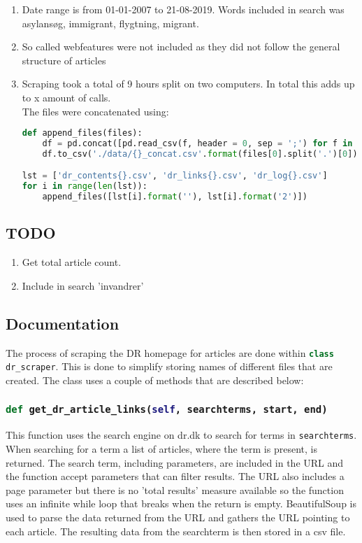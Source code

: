 \documentclass[10pt,a4paper]{article}
\author{Sebastian Baltser}
\newcommand{\python}{\lstinline[language=Python]}
\begin{document}
	\begin{enumerate}
		\item Date range is from 01-01-2007 to 21-08-2019. Words included in search was asylansøg, immigrant, flygtning, migrant.
		\item So called webfeatures were not included as they did not follow the general structure of articles
		\item Scraping took a total of 9 hours split on two computers. In total this adds up to x amount of calls.\\
		The files were concatenated using:
\begin{lstlisting}[language=Python]
def append_files(files):
	df = pd.concat([pd.read_csv(f, header = 0, sep = ';') for f in files], axis = 0)
	df.to_csv('./data/{}_concat.csv'.format(files[0].split('.')[0]), index = False) #Save to csv named as the first file with 'concat' appended

lst = ['dr_contents{}.csv', 'dr_links{}.csv', 'dr_log{}.csv']
for i in range(len(lst)):
	append_files([lst[i].format(''), lst[i].format('2')])
\end{lstlisting}
	\end{enumerate}
	\subsection{TODO}
	\begin{enumerate}
		\item Get total article count.
		\item Include in search 'invandrer'
	\end{enumerate}
	\subsection{Documentation}
		The process of scraping the DR homepage for articles are done within \lstinline[language=Python]|class dr_scraper|. This is done to simplify storing names of different files that are created. The class uses a couple of methods that are described below:
		\subsubsection{\python|def get_dr_article_links(self, searchterms, start, end)|}
			This function uses the search engine on dr.dk to search for terms in \python{searchterms}. When searching for a term a list of articles, where the term is present, is returned. The search term, including parameters, are included in the URL and the function accept parameters that can filter results. The URL also includes a page parameter but there is no 'total results' measure available so the function uses an infinite while loop that breaks when the return is empty. BeautifulSoup is used to parse the data returned from the URL and gathers the URL pointing to each article. The resulting data from the searchterm is then stored in a csv file.
			
\end{document}
